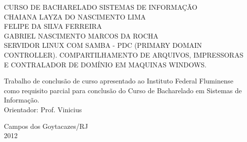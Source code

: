 \begin{titlepage}
 \begin{figure}[ht]
 \centering
 \end{figure}
 \begin{center}
   	{\large CURSO DE BACHARELADO SISTEMAS DE INFORMAÇÃO} \\ [3.5cm]
	{\large CHAIANA LAYZA DO NASCIMENTO LIMA} \\
	{\large FELIPE DA SILVA FERREIRA} \\	
	{\large GABRIEL NASCIMENTO MARCOS DA ROCHA} \\ [4cm]
   	{\large SERVIDOR LINUX COM SAMBA - PDC (PRIMARY DOMAIN CONTROLLER). COMPARTILHAMENTO DE ARQUIVOS, IMPRESSORAS E CONTRALADOR DE DOMÍNIO EM MAQUINAS WINDOWS.}\\ [2cm]
   \hspace{.45\textwidth} %
   \begin{minipage}{0.5\textwidth}
   \begin{espacosimples}
        Trabalho de conclusão de curso apresentado ao Instituto Federal Fluminense como requisito parcial para conclusão do Curso de Bacharelado em Sistemas de Informação.\\[1.5cm]
        Orientador: Prof. Vinicius
    \end{espacosimples}
    \end{minipage}
   \vfill
   {\large Campos dos Goytacazes/RJ} \\
   {\large 2012}
 \end{center}
\end{titlepage}
